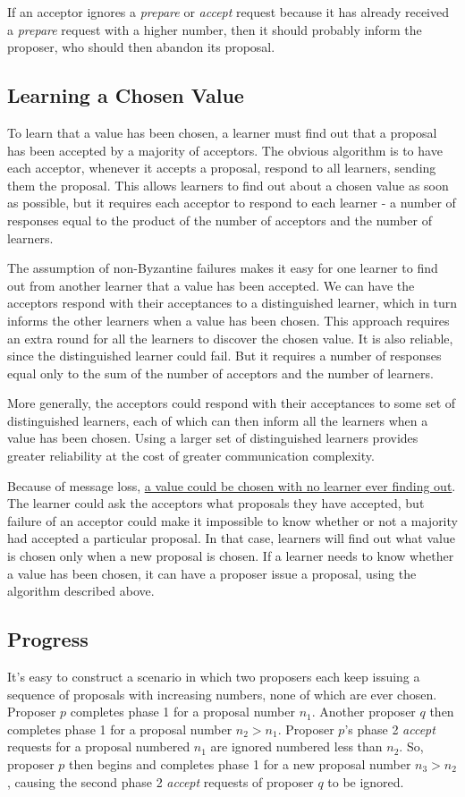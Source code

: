 \documentclass[11pt]{article}
\begin{document}
If an acceptor ignores a \emph{prepare} or \emph{accept} request because it has already received a \emph{prepare} request
with a higher number, then it should probably inform the proposer, who should then abandon its
proposal.
\subsection{Learning a Chosen Value}
\label{sec:org2927733}
To learn that a value has been chosen, a learner must find out that a proposal has been accepted by a
majority of acceptors. The obvious algorithm is to have each acceptor, whenever it accepts a proposal,
respond to all learners, sending them the proposal. This allows learners to find out about a chosen
value as soon as possible, but it requires each acceptor to respond to each learner - a number of
responses equal to the product of the number of acceptors and the number of learners.

The assumption of non-Byzantine failures makes it easy for one learner to find out from another
learner that a value has been accepted. We can have the acceptors respond with their acceptances to a
distinguished learner, which in turn informs the other learners when a value has been chosen. This
approach requires an extra round for all the learners to discover the chosen value. It is also
reliable, since the distinguished learner could fail. But it requires a number of responses equal
only to the sum of the number of acceptors and the number of learners.

More generally, the acceptors could respond with their acceptances to some set of distinguished
learners, each of which can then inform all the learners when a value has been chosen. Using a larger
set of distinguished learners provides greater reliability at the cost of greater communication
complexity.

Because of message loss, \uline{a value could be chosen with no learner ever finding out}. The learner could
ask the acceptors what proposals they have accepted, but failure of an acceptor could make it
impossible to know whether or not a majority had accepted a particular proposal. In that case,
learners will find out what value is chosen only when a new proposal is chosen. If a learner needs to
know whether a value has been chosen, it can have a proposer issue a proposal, using the algorithm
described above.
\subsection{Progress}
\label{sec:orgfe0ee16}
It's easy to construct a scenario in which two proposers each keep issuing a sequence of proposals
with increasing numbers, none of which are ever chosen. Proposer \(p\) completes phase 1 for a
proposal number \(n_1\). Another proposer \(q\) then completes phase 1 for a proposal number
\(n_2>n_1\). Proposer \(p\)'s phase 2 \emph{accept} requests for a proposal numbered \(n_1\) are ignored
numbered less than \(n_2\). So, proposer \(p\) then begins and completes phase 1 for a new proposal
number \(n_3>n_2\), causing the second phase 2 \emph{accept} requests of proposer \(q\) to be ignored.
\end{document}
